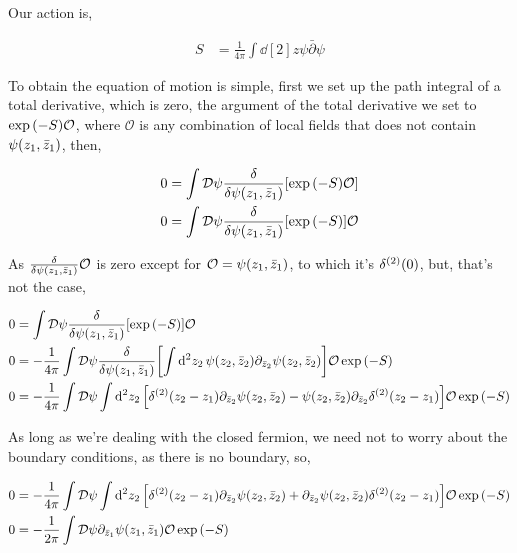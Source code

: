 \problem{}
\probitem{}

Our action is,

\begin{align*}
    S&=\frac{1}{4\pi}\int\dd[2]{z}\psi\bar\partial\psi
\end{align*}

To obtain the equation of motion is simple, first we set up the path integral of a total derivative, which is zero, the argument of the total derivative 
we set to $\exp\qty(-S)\mathcal O$, where $\mathcal O$ is any combination of local fields that does not contain $\psi\qty(z_1,{\bar z}_1)$, then,

\begin{align*}
    0&=\int\mathcal D\psi\fdv{}{\psi\qty(z_1,\bar z_1)}\qty[\exp\qty(-S)\mathcal O]\\
    0&=\int\mathcal D\psi\fdv{}{\psi\qty(z_1,\bar z_1)}\qty[\exp\qty(-S)]\mathcal O
\end{align*}

As $\fdv{}{\psi\qty(z_1,{\bar z}_1)}\mathcal O$ is zero except for $\mathcal O=\psi\qty(z_1,{\bar z}_1)$, to which it's $\delta^{\qty(2)}\qty(0)$, but, that's not the case,

\begin{align*}
    0&=\int\mathcal D\psi\fdv{}{\psi\qty(z_1,\bar z_1)}\qty[\exp\qty(-S)]\mathcal O\\
    0&=-\frac{1}{4\pi}\int\mathcal D\psi\fdv{}{\psi\qty(z_1,\bar z_1)}\qty[\int\dd[2]{z_2}\psi\qty(z_2,\bar z_2)\partial_{{\bar z}_2}\psi\qty(z_2,{\bar z}_2)]\mathcal O\exp\qty(-S)\\
    0&=-\frac{1}{4\pi}\int\mathcal D\psi\int\dd[2]{z_2}\qty[\delta^{\qty(2)}\qty(z_2-z_1)\partial_{{\bar z}_2}\psi\qty(z_2,{\bar z}_2)-\psi\qty(z_2,\bar z_2)\partial_{{\bar z}_2}\delta^{\qty(2)}\qty(z_2-z_1)]\mathcal O\exp\qty(-S)
\end{align*}

As long as we're dealing with the closed fermion, we need not to worry about the boundary conditions, as there is no boundary, so,

\begin{align*}
    0&=-\frac{1}{4\pi}\int\mathcal D\psi\int\dd[2]{z_2}\qty[\delta^{\qty(2)}\qty(z_2-z_1)\partial_{{\bar z}_2}\psi\qty(z_2,{\bar z}_2)+\partial_{{\bar z}_2}\psi\qty(z_2,\bar z_2)\delta^{\qty(2)}\qty(z_2-z_1)]\mathcal O\exp\qty(-S)\\
    0&=-\frac{1}{2\pi}\int\mathcal D\psi\partial_{{\bar z}_1}\psi\qty(z_1,{\bar z}_1)\mathcal O\exp\qty(-S)
\end{align*}

